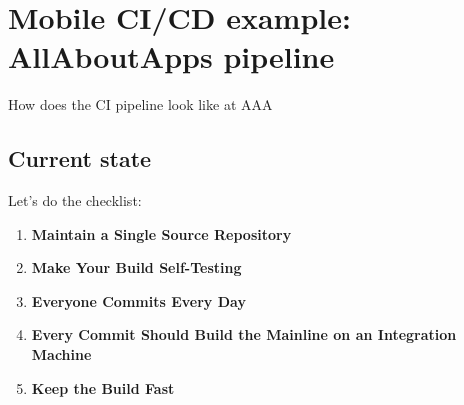 \section{Mobile CI/CD example: AllAboutApps pipeline}
How does the CI pipeline look like at AAA

\subsection{Current state}

Let's do the checklist: \\

\begin{enumerate}
	
	\item \textbf{Maintain a Single Source Repository}

	\item \textbf{Make Your Build Self-Testing}

	\item \textbf{Everyone Commits Every Day}

	\item \textbf{Every Commit Should Build the Mainline on an Integration Machine}

	\item \textbf{Keep the Build Fast}


\end{enumerate}
